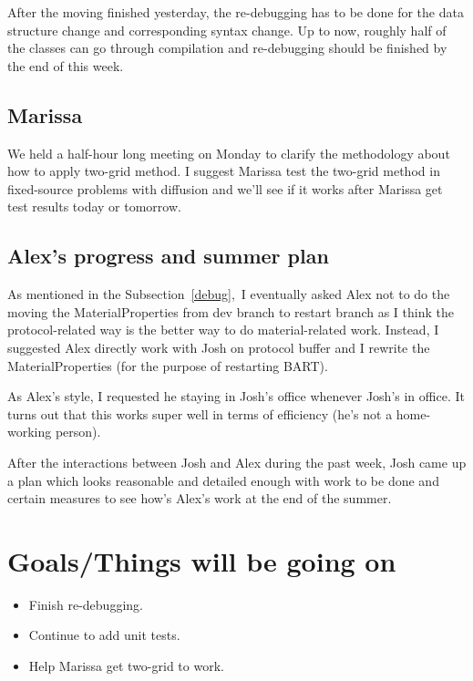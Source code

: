 \documentclass{article}
\begin{document}
After the moving finished yesterday, the re-debugging has to be done for the data structure change and corresponding syntax change. Up to now, roughly half of the classes can go through compilation and re-debugging should be finished by the end of this week.

\subsection{Marissa}
We held a half-hour long meeting on Monday to clarify the methodology about how to
apply two-grid method. I suggest Marissa test the two-grid method in fixed-source problems with
diffusion and we'll see if it works after Marissa get test results today or tomorrow.

\subsection{Alex's progress and summer plan}\label{alex}
As mentioned in the Subsection\ \ref{debug},\ I eventually asked Alex not to do the moving
the MaterialProperties from dev branch to restart branch 
as I think the protocol-related way is the better way to do material-related work. Instead,
I suggested Alex directly work with Josh on protocol buffer and I rewrite the MaterialProperties
(for the purpose of restarting BART).

As Alex's style, I requested he staying in Josh's office whenever Josh's in office. It turns out that
this works super well in terms of efficiency (he's not a home-working person).

After the interactions between Josh and Alex during the past week, Josh came up a plan which
looks reasonable and detailed enough with work to be done and certain measures to see how's 
Alex's work at the end of the summer.


\section{Goals/Things will be going on}
\begin{itemize}
	\item Finish re-debugging.
	\item Continue to add unit tests.
	\item Help Marissa get two-grid to work.
\end{itemize}
\end{document}

